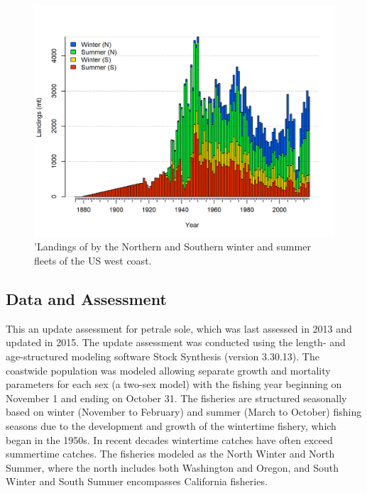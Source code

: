 \documentclass[12pt,]{article}
\begin{document}
\FloatBarrier

\begin{figure}
\centering
\includegraphics{r4ss/plots_mod1/catch2 landings stacked.png}
\caption{'Landings of by the Northern and Southern winter and summer
fleets of the US west coast. \label{fig:Exec_catch1}}
\end{figure}

\FloatBarrier

\subsection*{Data and Assessment}\label{data-and-assessment}

This an update assessment for petrale sole, which was last assessed in
2013 and updated in 2015. The update assessment was conducted using the
length- and age-structured modeling software Stock Synthesis (version
3.30.13). The coastwide population was modeled allowing separate growth
and mortality parameters for each sex (a two-sex model) with the fishing
year beginning on November 1 and ending on October 31. The fisheries are
structured seasonally based on winter (November to February) and summer
(March to October) fishing seasons due to the development and growth of
the wintertime fishery, which began in the 1950s. In recent decades
wintertime catches have often exceed summertime catches. The fisheries
modeled as the North Winter and North Summer, where the north includes
both Washington and Oregon, and South Winter and South Summer
encompasses California fisheries.
\end{document}
